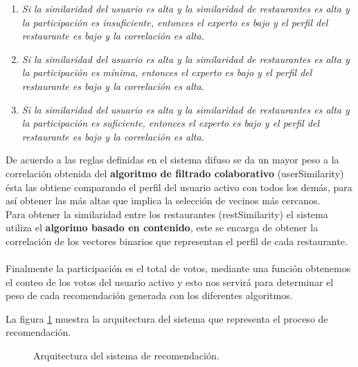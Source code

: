 \documentclass[12pt,letterpaper,oneside] {memoir}
\begin{document}
\begin{enumerate}
\item \textit{Si la similaridad del usuario es alta y la similaridad de restaurantes es alta y la participación es insuficiente, entonces el experto es bajo y el perfil del restaurante es bajo y la correlación es alta.}
\item  \textit{Si la similaridad del usuario es alta y la similaridad de restaurantes es alta y la participación es mínima, entonces el experto es bajo y el perfil del restaurante es bajo y la correlación es alta.}
\item \textit{Si la similaridad del usuario es alta y la similaridad de restaurantes es alta y la participación es suficiente, entonces el experto es bajo y el perfil del restaurante es bajo y la correlación es alta.}  
\end{enumerate}

De acuerdo a las reglas  definidas en el sistema difuso se da un mayor peso a la correlación obtenida del \textbf{algoritmo de filtrado colaborativo} (userSimilarity) ésta las obtiene comparando el perfil del usuario activo con todos los demás, para así obtener las más altas que implica la selección de vecinos más cercanos.\\
Para obtener la similaridad entre los restaurantes (restSimilarity) el sistema utiliza el \textbf{algorimo basado en contenido}, este se encarga de obtener la correlación de los vectores binarios que representan el perfil de cada restaurante.
\paragraph{}
Finalmente la participación es el total de votos, mediante una función obtenemos el conteo de los votos del usuario activo y esto nos servirá para  determinar el peso de cada recomendación generada con los diferentes algoritmos.

La figura \ref{fig:arquitectura} muestra la arquitectura del sistema que representa el proceso de recomendación.

\begin{figure}[H] 
\centering 
{} \caption{Arquitectura del sistema de recomendación.} 
\label{fig:arquitectura} 
\end{figure}
\end{document}
